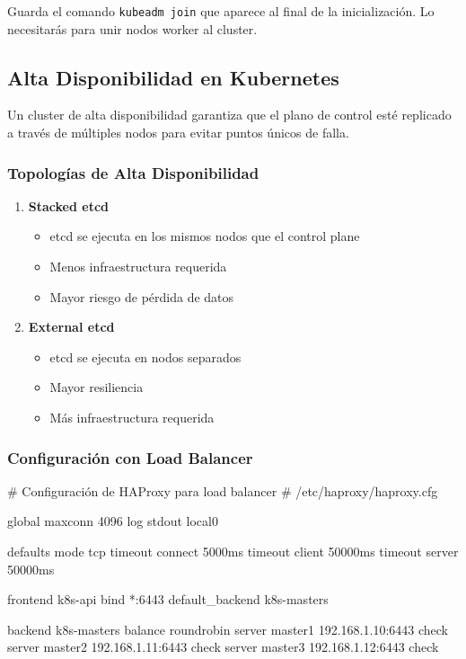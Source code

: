 \documentclass[11pt,a4paper]{article}
\begin{document}
\begin{tipbox}
Guarda el comando \texttt{kubeadm join} que aparece al final de la inicialización. Lo necesitarás para unir nodos worker al cluster.
\end{tipbox}

\subsection{Alta Disponibilidad en Kubernetes}

Un cluster de alta disponibilidad garantiza que el plano de control esté replicado a través de múltiples nodos para evitar puntos únicos de falla.

\subsubsection{Topologías de Alta Disponibilidad}

\begin{enumerate}
    \item \textbf{\textcolor{k8sblue}{Stacked etcd}}
    \begin{itemize}
        \item etcd se ejecuta en los mismos nodos que el control plane
        \item Menos infraestructura requerida
        \item Mayor riesgo de pérdida de datos
    \end{itemize}
    
    \item \textbf{\textcolor{k8ssuccess}{External etcd}}
    \begin{itemize}
        \item etcd se ejecuta en nodos separados
        \item Mayor resiliencia
        \item Más infraestructura requerida
    \end{itemize}
\end{enumerate}

\subsubsection{Configuración con Load Balancer}

\begin{commandbox}
\# Configuración de HAProxy para load balancer
\# /etc/haproxy/haproxy.cfg

global
    maxconn 4096
    log stdout local0

defaults
    mode tcp
    timeout connect 5000ms
    timeout client 50000ms
    timeout server 50000ms

frontend k8s-api
    bind *:6443
    default\_backend k8s-masters

backend k8s-masters
    balance roundrobin
    server master1 192.168.1.10:6443 check
    server master2 192.168.1.11:6443 check
    server master3 192.168.1.12:6443 check
\end{commandbox}
\end{document}

